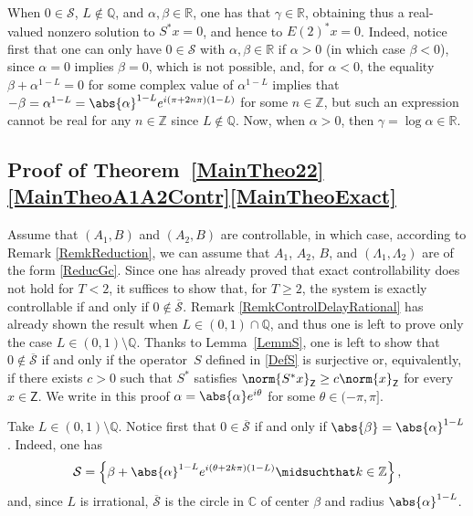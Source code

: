 \begin{remk}
When $0 \in \mathcal S$, $L \notin \mathbb Q$, and $\alpha, \beta \in \mathbb R$, one has that $\gamma \in \mathbb R$, obtaining thus a real-valued nonzero solution to $S^\ast x = 0$, and hence to $E(2)^\ast x = 0$. Indeed, notice first that one can only have $0 \in \mathcal S$ with $\alpha, \beta \in \mathbb R$ if $\alpha > 0$ (in which case $\beta < 0$), since $\alpha = 0$ implies $\beta = 0$, which is not possible, and, for $\alpha < 0$, the equality $\beta + \alpha^{1 - L} = 0$ for some complex value of $\alpha^{1 - L}$ implies that $-\beta = \alpha^{1-L} = \abs{\alpha}^{1-L} e^{i (\pi + 2 n \pi)(1 - L)}$ for some $n \in \mathbb Z$, but such an expression cannot be real for any $n \in \mathbb Z$ since $L \notin \mathbb Q$. Now, when $\alpha > 0$, then $\gamma = \log\alpha \in \mathbb R$.
\end{remk}

\subsection{Proof of Theorem~\ref{MainTheo22}\eqref{MainTheoA1A2Contr}\eqref{MainTheoExact}}
Assume that $(A_1, B)$ and $(A_2, B)$ are controllable, in which case, according to Remark \ref{RemkReduction}, we can assume that $A_1$, $A_2$, $B$, and $(\Lambda_1, \Lambda_2)$ are of the form \eqref{ReducGc}. Since one has already proved that exact controllability does not hold for $T < 2$, it suffices to show that, for $T \geq 2$, the system is exactly controllable if and only if $0 \notin \overline{\mathcal S}$. Remark \ref{RemkControlDelayRational} has already shown the result when $L \in (0, 1) \cap \mathbb Q$, and thus one is left to prove only the case $L \in (0, 1) \setminus \mathbb Q$. Thanks to Lemma~\ref{LemmS}, one is left to show that $0 \notin \overline{\mathcal S}$ if and only if the operator~$S$ defined in \eqref{DefS} is surjective or, equivalently, if there exists $c > 0$ such that $S^\ast$ satisfies $\norm{S^\ast x}_{\mathsf Z} \geq c \norm{x}_{\mathsf Z}$ for every $x \in \mathsf Z$. We write in this proof $\alpha = \abs{\alpha} e^{i\theta}$ for some $\theta \in (-\pi, \pi]$.

Take $L \in (0, 1) \setminus \mathbb Q$. Notice first that $0 \in \overline{\mathcal S}$ if and only if $\abs{\beta} = \abs{\alpha}^{1-L}$. Indeed, one has
\[
\mathcal S = \left\{\beta + \abs{\alpha}^{1 - L} e^{i (\theta + 2 k \pi)\left(1 - L\right)} \midsuchthat k \in \mathbb Z\right\},
\]
and, since $L$ is irrational, $\overline{\mathcal S}$ is the circle in $\mathbb C$ of center $\beta$ and radius $\abs{\alpha}^{1-L}$.

